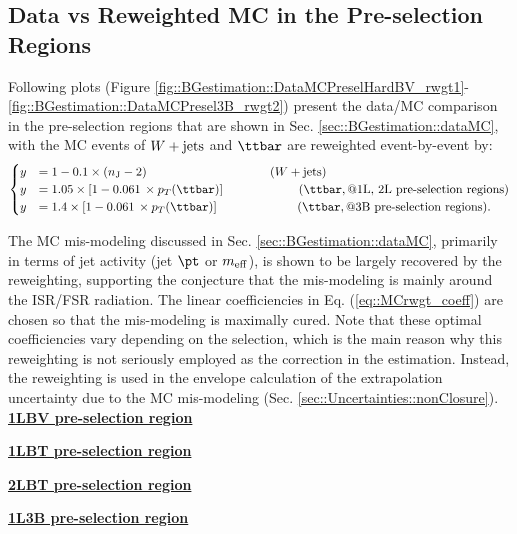 \subsection{Data vs Reweighted MC in the Pre-selection Regions} \label{sec::Appendix::dataMC_rwgt}
Following plots (Figure \ref{fig::BGestimation::DataMCPreselHardBV_rwgt1}-\ref{fig::BGestimation::DataMCPresel3B_rwgt2}) present the data/MC comparison in the pre-selection regions that are shown in Sec. \ref{sec::BGestimation::dataMC},
with the MC events of $W+\mathrm{jets}$ and $\ttbar$ are reweighted event-by-event by:
\begin{align}                                                                                 
\begin{cases}
y & = 1 - 0.1 \times (\nJetNoGev-2) \mbox{\phantom{MMMMMMMMMMM}} (\wjets) \nn \\
y & = 1.05 \times \left[ 1 - 0.061 \,\times p_T(\ttbar) \right] \mbox{\phantom{MMMMMMk}} (\ttbar, \mbox{@1L, 2L pre-selection regions}) \nn \\
y & = 1.4 \times \left[ 1 - 0.061 \,\times p_T(\ttbar) \right] \mbox{\phantom{MMMMMMM}} (\ttbar, \mbox{@3B pre-selection regions}). 
\end{cases} \\
\label{eq::MCrwgt_coeff}
\end{align} 

The MC mis-modeling discussed in Sec. \ref{sec::BGestimation::dataMC}, primarily in terms of jet activity (jet $\pt$ or $m_{\mathrm{eff}}$), is shown to be largely recovered by the reweighting, supporting the conjecture that the mis-modeling is mainly around the ISR/FSR radiation. The linear coefficiencies in Eq. (\ref{eq::MCrwgt_coeff}) are chosen so that the mis-modeling is maximally cured. Note that these optimal coefficiencies vary depending on the selection, which is the main reason why this reweighting is not seriously employed as the correction in the estimation. Instead, the reweighting is used in the envelope calculation of the extrapolation uncertainty due to the MC mis-modeling (Sec. \ref{sec::Uncertainties::nonClosure}). \\

\underline{\textbf{1LBV pre-selection region}} 
  
\clearpage
\underline{\textbf{1LBT pre-selection region}} 
   
\clearpage
\underline{\textbf{2LBT pre-selection region}} 

\clearpage
\underline{\textbf{1L3B pre-selection region}}  

